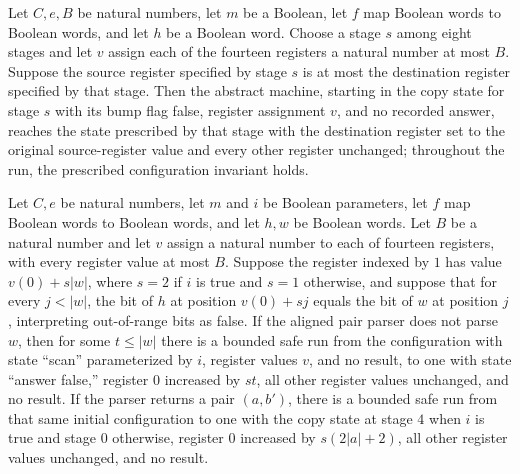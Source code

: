 \begin{lemma}
\label{Complexity.comp_copy_run}
\leanok
{}
Let $C,e,B$ be natural numbers, let $m$ be a Boolean, let $f$ map Boolean words to
Boolean words, and let $h$ be a Boolean word. Choose a stage $s$ among eight stages and
let $v$ assign each of the fourteen registers a natural number at most $B$. Suppose the
source register specified by stage $s$ is at most the destination register specified by
that stage. Then the abstract machine, starting in the copy state for stage $s$ with its
bump flag false, register assignment $v$, and no recorded answer, reaches the state
prescribed by that stage with the destination register set to the original
source-register value and every other register unchanged; throughout the run, the
prescribed configuration invariant holds.
\end{lemma}

\begin{lemma}
\label{Complexity.comp_pair_run}
\leanok
{}
Let $C,e$ be natural numbers, let $m$ and $i$ be Boolean parameters, let $f$ map Boolean
words to Boolean words, and let $h,w$ be Boolean words. Let $B$ be a natural number and
let $v$ assign a natural number to each of fourteen registers, with every register value
at most $B$. Suppose the register indexed by $1$ has value $v(0)+s|w|$, where $s=2$ if
$i$ is true and $s=1$ otherwise, and suppose that for every $j<|w|$, the bit of $h$ at
position $v(0)+sj$ equals the bit of $w$ at position $j$, interpreting out-of-range bits
as false. If the aligned pair parser does not parse $w$, then for some $t\le |w|$ there
is a bounded safe run from the configuration with state “scan” parameterized by $i$,
register values $v$, and no result, to one with state “answer false,” register $0$
increased by $st$, all other register values unchanged, and no result. If the parser
returns a pair $(a,b')$, there is a bounded safe run from that same initial
configuration to one with the copy state at stage $4$ when $i$ is true and stage $0$
otherwise, register $0$ increased by $s(2|a|+2)$, all other register values unchanged,
and no result.
\end{lemma}


